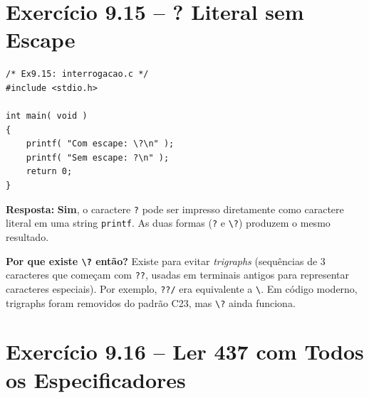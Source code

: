 \documentclass[12pt,a4paper]{article}
\begin{document}
\newpage

\section{Exercício 9.15 -- ? Literal sem Escape}

\begin{respostabox}
\begin{lstlisting}
/* Ex9.15: interrogacao.c */
#include <stdio.h>

int main( void )
{
    printf( "Com escape: \?\n" );
    printf( "Sem escape: ?\n" );
    return 0;
}
\end{lstlisting}

\textbf{Resposta:} \textbf{Sim}, o caractere \texttt{?} pode ser impresso diretamente
como caractere literal em uma string \texttt{printf}. As duas formas (\texttt{?}
e \texttt{\textbackslash ?}) produzem o mesmo resultado.

\textbf{Por que existe \texttt{\textbackslash ?} então?} Existe para evitar
\textit{trigraphs} (sequências de 3 caracteres que começam com \texttt{??}, usadas
em terminais antigos para representar caracteres especiais). Por exemplo,
\texttt{??/} era equivalente a \texttt{\textbackslash}. Em código moderno, trigraphs
foram removidos do padrão C23, mas \texttt{\textbackslash ?} ainda funciona.
\end{respostabox}

\section{Exercício 9.16 -- Ler 437 com Todos os Especificadores}
\end{document}
